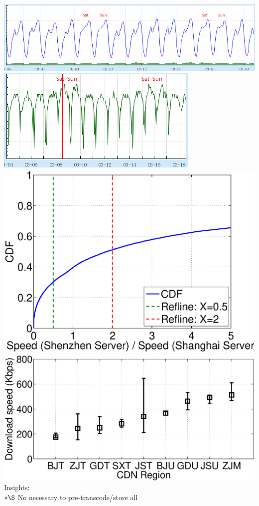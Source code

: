 \documentclass[landscape,final,a0paper,fontscale=0.285]{baposter}
\begin{document}
\begin{poster}
{		%
		\includegraphics[width=0.65\linewidth]{fig/bandwidth.png}
		\includegraphics[width=0.34\linewidth]{fig/cpu_utilization.png}\\
		\includegraphics[width=0.44\linewidth]{fig/user-server-speed-ratio.eps}
		\includegraphics[width=0.55\linewidth]{fig/region-speed-distribution.eps}\\
	Insights:\\
		$\star \S$ No necessary to pre-transcode/store all\\
}
\end{poster}
\end{document}
